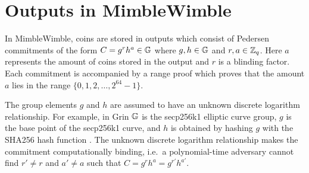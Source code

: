 

\section{Outputs in MimbleWimble}

In MimbleWimble, coins are stored in outputs which consist of Pedersen commitments of the form $C = g^rh^a\in \mathbb{G}$ where $g , h \in \mathbb{G}$ and $r,a \in \mathbb{Z}_q$. Here $a$ represents the amount of coins stored in the output and $r$ is a blinding factor. Each commitment is accompanied by a range proof which proves that the amount $a$ lies in the range $\{0,1,2,\ldots,2^{64}-1\}$.

The group elements $g$ and $h$ are assumed to have an unknown discrete logarithm relationship. For example, in Grin $\mathbb{G}$ is the secp256k1 elliptic curve group, $g$ is the base point of the secp256k1 curve, and $h$ is obtained by hashing $g$ with the SHA256 hash function \cite{RustSecp256k1Constants}. The unknown discrete logarithm relationship makes the commitment computationally binding, i.e.~a polynomial-time adversary cannot find $r' \neq r$ and $a' \neq a$ such that $C = g^rh^a = g^{r'}h^{a'}$.

